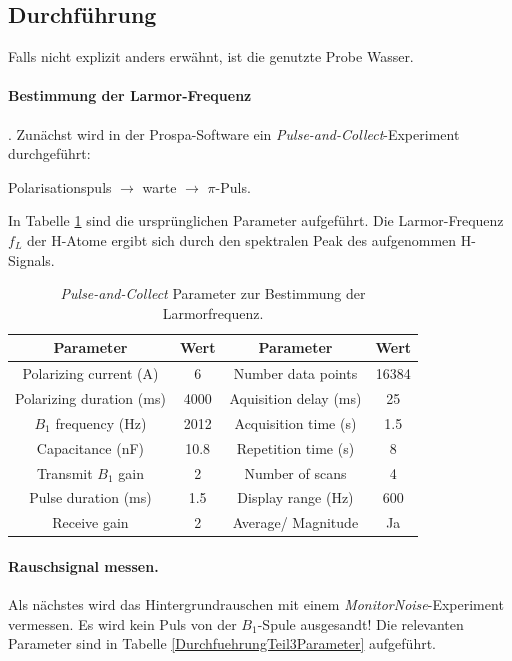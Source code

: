 \documentclass[../main.tex]{subfiles}
\begin{document}
\newpage
\subsection{Durchführung}
    Falls nicht explizit anders erwähnt, ist die genutzte Probe Wasser. 

    \paragraph{Bestimmung der Larmor-Frequenz}.
        Zunächst wird in der Prospa-Software ein \textit{Pulse-and-Collect}-Experiment durchgeführt:
        \begin{center}
            Polarisationspuls $\rightarrow$ warte $\rightarrow$ $\pi$-Puls.
        \end{center}
        In Tabelle \ref{tab:DurchfuehrungTeil2Parameter} sind die ursprünglichen Parameter aufgeführt. Die Larmor-Frequenz $f_L$ der H-Atome ergibt sich durch den spektralen Peak des aufgenommen H-Signals.

        \begin{table}[H]
            \centering
            \begin{tabular}{cc|cc}
                 \textbf{Parameter} & \textbf{Wert} & \textbf{Parameter} & \textbf{Wert}  \\\hline\hline
                Polarizing current (\si{\ampere}) & 6 & Number data points & 16384\\\hline
                Polarizing duration (\si{\milli\second}) & 4000 & Aquisition delay (\si{\milli\second}) & 25\\\hline
                $B_1$ frequency (\si{\hertz}) & 2012 & Acquisition time (\si{\second}) & \num{1.5}\\\hline
                Capacitance (\si{\nano\farad}) & \num{10.8} & Repetition time (\si{\second}) & 8\\\hline
                Transmit $B_1$ gain & 2 & Number of scans & 4\\\hline
                Pulse duration (\si{\milli\second}) & \num{1.5} & Display range (\si{\hertz}) & 600\\\hline
                Receive gain & 2 & Average/ Magnitude & Ja
            \end{tabular}
            \caption{\textit{Pulse-and-Collect} Parameter zur Bestimmung der Larmorfrequenz.}
            \label{tab:DurchfuehrungTeil2Parameter}
        \end{table}

    \paragraph{Rauschsignal messen.}
        Als nächstes wird das Hintergrundrauschen mit einem \textit{MonitorNoise}-Experiment vermessen. Es wird kein Puls von der $B_1$-Spule ausgesandt! Die relevanten Parameter sind in Tabelle \ref{DurchfuehrungTeil3Parameter} aufgeführt.  
\end{document}
